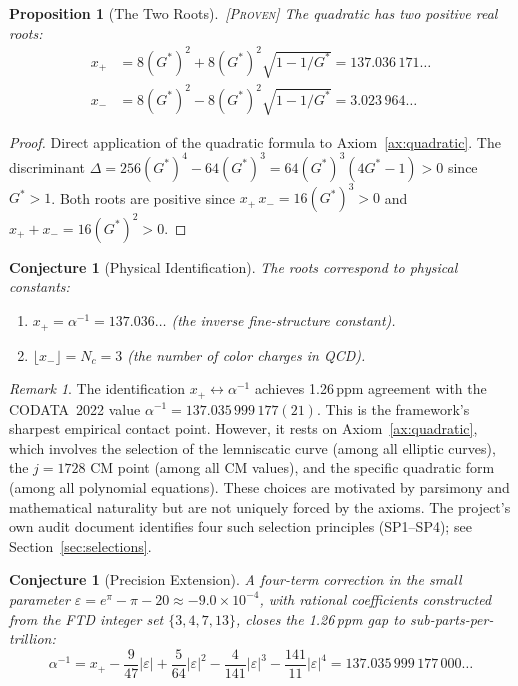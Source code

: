 \documentclass[11pt,twoside]{article}
\theoremstyle{definition}
\theoremstyle{plain}
\newtheorem{proposition}[axiom]{Proposition}
\newtheorem{conjecture}[axiom]{Conjecture}
\theoremstyle{remark}
\newtheorem{remark}[axiom]{Remark}
\newcommand{\etag}[1]{\,\textnormal{\textsc{\footnotesize[#1]}}}
\newcommand{\proven}{\etag{Proven}}
\newcommand{\Gstar}{G^{*}}
\begin{document}
\begin{proposition}[The Two Roots]\label{prop:roots}\proven
The quadratic has two positive real roots:
\begin{align}
    x_+ &= 8(\Gstar)^2 + 8(\Gstar)^2\sqrt{1 - 1/\Gstar} = 137.036\,171\ldots \\
    x_- &= 8(\Gstar)^2 - 8(\Gstar)^2\sqrt{1 - 1/\Gstar} = 3.023\,964\ldots
\end{align}
\end{proposition}

\begin{proof}
Direct application of the quadratic formula to Axiom~\ref{ax:quadratic}. The discriminant $\Delta = 256(\Gstar)^4 - 64(\Gstar)^3 = 64(\Gstar)^3(4\Gstar - 1) > 0$ since $\Gstar > 1$. Both roots are positive since $x_+\,x_- = 16(\Gstar)^3 > 0$ and $x_+ + x_- = 16(\Gstar)^2 > 0$. \qedhere
\end{proof}

\begin{conjecture}[Physical Identification]\label{conj:alpha}
The roots correspond to physical constants:
\begin{enumerate}[label=(\roman*), nosep]
    \item $x_+ = \alpha^{-1} = 137.036\ldots$\; (the inverse fine-structure constant).
    \item $\lfloor x_- \rfloor = N_c = 3$\; (the number of color charges in QCD).
\end{enumerate}
\end{conjecture}

\begin{remark}
The identification $x_+ \leftrightarrow \alpha^{-1}$ achieves 1.26\,ppm agreement with the CODATA~2022 value $\alpha^{-1} = 137.035\,999\,177(21)$. This is the framework's sharpest empirical contact point. However, it rests on Axiom~\ref{ax:quadratic}, which involves the selection of the lemniscatic curve (among all elliptic curves), the $j = 1728$ CM point (among all CM values), and the specific quadratic form (among all polynomial equations). These choices are motivated by parsimony and mathematical naturality but are not uniquely forced by the axioms. The project's own audit document identifies four such selection principles (SP1--SP4); see Section~\ref{sec:selections}.
\end{remark}

\begin{conjecture}[Precision Extension]\label{conj:precision}
A four-term correction in the small parameter $\varepsilon = e^\pi - \pi - 20 \approx -9.0 \times 10^{-4}$, with rational coefficients constructed from the FTD integer set $\{3, 4, 7, 13\}$, closes the 1.26\,ppm gap to sub-parts-per-trillion:
\begin{equation}
    \alpha^{-1} = x_+ - \frac{9}{47}|\varepsilon| + \frac{5}{64}|\varepsilon|^2 - \frac{4}{141}|\varepsilon|^3 - \frac{141}{11}|\varepsilon|^4 = 137.035\,999\,177\,000\ldots
\end{equation}
\end{conjecture}
\end{document}
